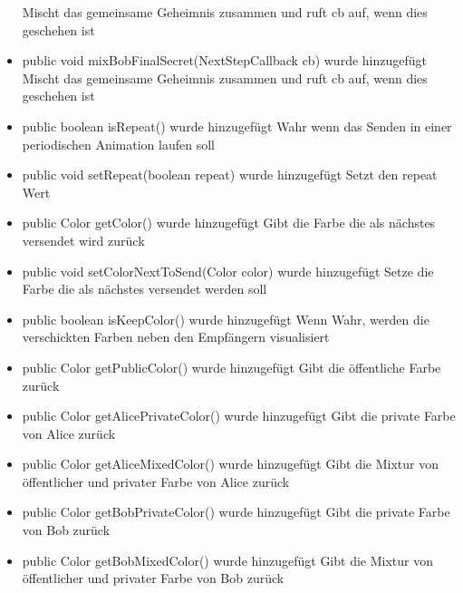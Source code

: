 \documentclass{article}
\begin{document}
\begin{itemize}
               Mischt das gemeinsame Geheimnis zusammen und ruft cb auf, wenn dies geschehen ist\newline
           \item public void mixBobFinalSecret(NextStepCallback cb) wurde hinzugefügt\newline
               Mischt das gemeinsame Geheimnis zusammen und ruft cb auf, wenn dies geschehen ist\newline
           \item public boolean isRepeat() wurde hinzugefügt\newline
               Wahr wenn das Senden in einer periodischen Animation laufen soll\newline
           \item public void setRepeat(boolean repeat) wurde hinzugefügt\newline
               Setzt den repeat Wert\newline
           \item public Color getColor() wurde hinzugefügt\newline
               Gibt die Farbe die als nächstes versendet wird zurück\newline
           \item public void setColorNextToSend(Color color) wurde hinzugefügt\newline
               Setze die Farbe die als nächstes versendet werden soll\newline
           \item public boolean isKeepColor() wurde hinzugefügt\newline
               Wenn Wahr, werden die verschickten Farben neben den Empfängern visualisiert\newline
           \item public Color getPublicColor() wurde hinzugefügt\newline
               Gibt die öffentliche Farbe zurück\newline
           \item public Color getAlicePrivateColor() wurde hinzugefügt\newline
               Gibt die private Farbe von Alice zurück\newline
           \item public Color getAliceMixedColor() wurde hinzugefügt\newline
               Gibt die Mixtur von öffentlicher und privater Farbe von Alice zurück\newline
           \item public Color getBobPrivateColor() wurde hinzugefügt\newline
               Gibt die private Farbe von Bob zurück\newline
           \item public Color getBobMixedColor() wurde hinzugefügt\newline
               Gibt die Mixtur von öffentlicher und privater Farbe von Bob zurück\newline
           \end{itemize}
\end{document}
